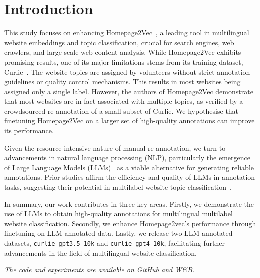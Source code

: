 \section{Introduction}

This study focuses on enhancing Homepage2Vec~\cite{homepage2vec}, a leading tool in multilingual website embeddings and topic classification, crucial for search engines, web crawlers, and large-scale web content analysis. While Homepage2Vec exhibits promising results, one of its major limitations stems from its training dataset, Curlie~\cite{curlie}. The website topics are assigned by volunteers without strict annotation guidelines or quality control mechanisms. This results in most websites being assigned only a single label. However, the authors of Homepage2Vec demonstrate that most websites are in fact associated with multiple topics, as verified by a crowdsourced re-annotation of a small subset of Curlie. We hypothesise that finetuning Homepage2Vec on a larger set of high-quality annotations can improve its performance.

Given the resource-intensive nature of manual re-annotation, we turn to advancements in natural language processing (NLP), particularly the emergence of Large Language Models (LLMs)~\cite{gpt3, gpt4} as a viable alternative for generating reliable annotations. Prior studies affirm the efficiency and quality of LLMs in annotation tasks, suggesting their potential in multilabel website topic classification~\cite{is-gpt3-good-annot,prompt-tuning,annollm,reduce-labeling-cost}.

In summary, our work contributes in three key areas. Firstly, we demonstrate the use of LLMs to obtain high-quality annotations for multilingual multilabel website classification. Secondly, we enhance Homepage2vec's performance through finetuning on LLM-annotated data. Lastly, we release two LLM-annotated datasets, \texttt{curlie-gpt3.5-10k} and \texttt{curlie-gpt4-10k}, facilitating further advancements in the field of multilingual website classification.

\textit{The code and experiments are available on \href{https://github.com/CS-433/ml-project-2-mlp}{GitHub} and \href{https://wandb.ai/ml-project-2-mlp/homepage2vec}{W\&B}.}
